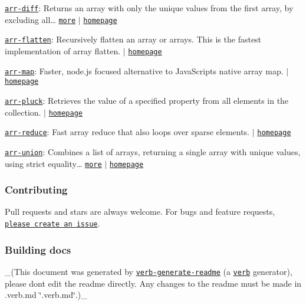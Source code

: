 \begin{DoxyItemize}
\item \href{https://www.npmjs.com/package/arr-diff}{\tt arr-\/diff}\+: Returns an array with only the unique values from the first array, by excluding all… \href{https://github.com/jonschlinkert/arr-diff}{\tt more} $\vert$ \href{https://github.com/jonschlinkert/arr-diff}{\tt homepage}
\item \href{https://www.npmjs.com/package/arr-flatten}{\tt arr-\/flatten}\+: Recursively flatten an array or arrays. This is the fastest implementation of array flatten. $\vert$ \href{https://github.com/jonschlinkert/arr-flatten}{\tt homepage}
\item \href{https://www.npmjs.com/package/arr-map}{\tt arr-\/map}\+: Faster, node.\+js focused alternative to Java\+Script\textquotesingle{}s native array map. $\vert$ \href{https://github.com/jonschlinkert/arr-map}{\tt homepage}
\item \href{https://www.npmjs.com/package/arr-pluck}{\tt arr-\/pluck}\+: Retrieves the value of a specified property from all elements in the collection. $\vert$ \href{https://github.com/jonschlinkert/arr-pluck}{\tt homepage}
\item \href{https://www.npmjs.com/package/arr-reduce}{\tt arr-\/reduce}\+: Fast array reduce that also loops over sparse elements. $\vert$ \href{https://github.com/jonschlinkert/arr-reduce}{\tt homepage}
\item \href{https://www.npmjs.com/package/arr-union}{\tt arr-\/union}\+: Combines a list of arrays, returning a single array with unique values, using strict equality… \href{https://github.com/jonschlinkert/arr-union}{\tt more} $\vert$ \href{https://github.com/jonschlinkert/arr-union}{\tt homepage}
\end{DoxyItemize}

\subsubsection*{Contributing}

Pull requests and stars are always welcome. For bugs and feature requests, \href{../../issues/new}{\tt please create an issue}.

\subsubsection*{Building docs}

\+\_\+(This document was generated by \href{https://github.com/verbose/verb-generate-readme}{\tt verb-\/generate-\/readme} (a \href{https://github.com/verbose/verb}{\tt verb} generator), please don\textquotesingle{}t edit the readme directly. Any changes to the readme must be made in .verb.\+md \char`\"{}.\+verb.\+md\char`\"{}.)\+\_\+

